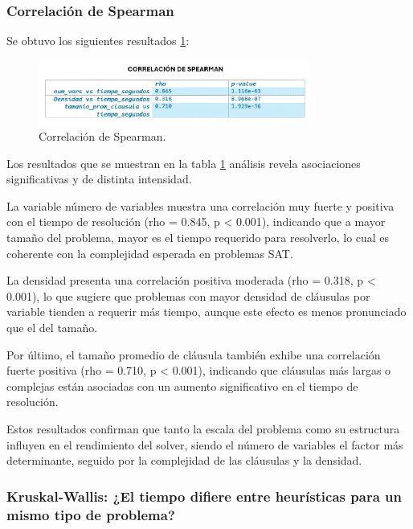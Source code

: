 \subsubsection{Correlaci\'on de Spearman}
Se obtuvo los siguientes resultados \ref{fig:correlacion-spearman}:

\begin{figure}[ht]
    \centering
    \includegraphics[width=0.8\textwidth]{Graphics/correlacion_spearman.png}
    \caption{Correlaci\'on de Spearman.}
    \label{fig:correlacion-spearman}
\end{figure}

Los resultados que se muestran en la tabla \ref{fig:correlacion-spearman} an\'alisis revela asociaciones significativas y de distinta intensidad.

La variable número de variables muestra una correlación muy fuerte y positiva con el tiempo de resolución (rho = 0.845, p < 0.001), indicando que a mayor tamaño del problema, mayor es el tiempo requerido para resolverlo, lo cual es coherente con la complejidad esperada en problemas SAT.

La densidad presenta una correlación positiva moderada (rho = 0.318, p < 0.001), lo que sugiere que problemas con mayor densidad de cláusulas por variable tienden a requerir más tiempo, aunque este efecto es menos pronunciado que el del tamaño.

Por último, el tamaño promedio de cl\'ausula tambi\'en exhibe una correlación fuerte positiva (rho = 0.710, p < 0.001), indicando que cláusulas más largas o complejas están asociadas con un aumento significativo en el tiempo de resolución.

Estos resultados confirman que tanto la escala del problema como su estructura influyen en el rendimiento del solver, siendo el número de variables el factor más determinante, seguido por la complejidad de las cláusulas y la densidad. 

\subsubsection{Kruskal-Wallis: ¿El tiempo difiere entre heurísticas para un mismo tipo de problema?}


